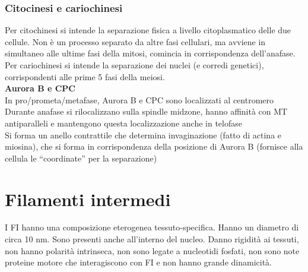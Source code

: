         \subsubsection{Citocinesi e cariochinesi}
            Per citochinesi si intende la separazione fisica a livello citoplasmatico delle due cellule. Non è un processo separato da altre fasi cellulari, ma avviene in simultaneo alle ultime fasi della mitosi, comincia in corrispondenza dell’anafase.\\
            Per cariochinesi si intende la separazione dei nuclei (e corredi genetici), corrispondenti alle prime 5 fasi della meiosi.\\
            
            \textbf{Aurora B e CPC}\\
            In pro/prometa/metafase, Aurora B e CPC sono localizzati al centromero\\
            Durante anafase si rilocalizzano sulla spindle midzone, hanno affinità con MT antiparalleli e mantengono questa localizzazione anche in telofase\\
            Si forma un anello contrattile che determina invaginazione (fatto di actina e miosina), che si forma in corrispondenza della posizione di Aurora B (fornisce alla cellula le “coordinate” per la separazione) 
            
\section{Filamenti intermedi}
    I FI hanno una composizione eterogenea tessuto-specifica. Hanno un diametro di circa 10 nm.
    Sono presenti anche all'interno del nucleo. Danno rigidità ai tessuti, non hanno polarità intrinseca, non sono legate a nucleotidi fosfati, non sono note proteine motore che interagiscono con FI e non hanno grande dinamicità.
    

